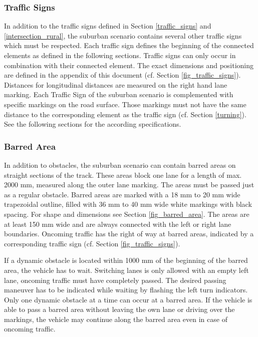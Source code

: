 \documentclass[a4paper]{report}
\begin{document}
\subsubsection{Traffic Signs}

In addition to the traffic signs defined in Section \ref{traffic_signs} and
\ref{intersection_rural}, the suburban scenario contains several other traffic
signs which must be respected. Each traffic sign defines the beginning of the
connected elements as defined in the following sections. Traffic signs can only
occur in combination with their connected element. The exact dimensions and
positioning are defined in the appendix of this document (cf. Section
\ref{fig_traffic_signs}). Distances for longitudinal distances are measured on
the right hand lane marking. Each Traffic Sign of the suburban scenario is
complemented with specific markings on the road surface. Those markings must
not have the same distance to the corresponding element as the traffic sign
(cf. Section \ref{turning}). See the following sections for the according
specifications.

\subsubsection{Barred Area}

In addition to obstacles, the suburban scenario can contain barred areas on
straight sections of the track. These areas block one lane for a length of max.
2000 mm, measured along the outer lane marking. The areas must be passed just
as a regular obstacle. Barred areas are marked with a 18 mm to 20 mm wide
trapezoidal outline, filled with 36 mm to 40 mm wide white markings with black
spacing. For shape and dimensions see Section \ref{fig_barred_area}. The areas
are at least 150 mm wide and are always connected with the left or right lane
boundaries. Oncoming traffic has the right of way at barred areas, indicated by
a corresponding traffic sign (cf. Section \ref{fig_traffic_signs}).

If a dynamic obstacle is located within 1000 mm of the beginning of the barred
area, the vehicle has to wait. Switching lanes is only allowed with an empty
left lane, oncoming traffic must have completely passed. The desired passing
maneuver has to be indicated while waiting by flashing the left turn
indicators. Only one dynamic obstacle at a time can occur at a barred area. If
the vehicle is able to pass a barred area without leaving the own lane or
driving over the markings, the vehicle may continue along the barred area even
in case of oncoming traffic.
\end{document}
